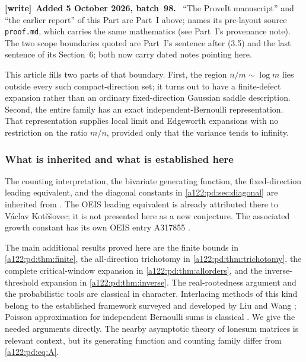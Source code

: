 \documentclass[11pt,letterpaper]{article}
\newenvironment{writenote}[1][]{\par\smallskip\begingroup\small
 \noindent\textbf{[write]}\if\relax\detokenize{#1}\relax\else~\textbf{#1.}\fi\ }%
 {\par\endgroup\smallskip}
\numberwithin{equation}{subsection}
\theoremstyle{definition}
\theoremstyle{remark}
\theoremstyle{plain}
\begin{document}
\begin{writenote}[Added 5 October 2026, batch~98]
``The ProveIt manuscript'' and ``the earlier report'' of this Part are
Part~I above; \cite{a122:pd:repo} names its pre-layout source
\nolinkurl{proof.md}, which carries the same mathematics (see Part~I's
provenance note). The two scope boundaries quoted are Part~I's sentence
after (3.5) and the last sentence of its Section~6; both now carry dated
notes pointing here.
\end{writenote}

This article fills two parts of that boundary. First, the region
$n/m\sim\log m$ lies outside every such compact-direction set; it turns
out to have a finite-defect expansion rather than an ordinary
fixed-direction Gaussian saddle description. Second, the entire family
has an exact independent-Bernoulli representation. That representation
supplies local limit and Edgeworth expansions with no restriction on the
ratio $m/n$, provided only that the variance tends to infinity.

\subsubsection{What is inherited and what is established here}
The counting interpretation, the bivariate generating function, the
fixed-direction leading equivalent, and the diagonal constants in
\cref{a122:pd:sec:diagonal} are inherited from \cite{a122:pd:repo}. The OEIS leading
equivalent is already attributed there to V\'aclav Kot\v{e}\v{s}ovec;
it is not presented here as a new conjecture. The associated growth
constant has its own OEIS entry A317855 \cite{a122:pd:oeis317855}.

The main additional results proved here are the finite bounds in
\cref{a122:pd:thm:finite}, the all-direction trichotomy in \cref{a122:pd:thm:trichotomy},
the complete critical-window expansion in \cref{a122:pd:thm:allorders}, and the
inverse-threshold expansion in \cref{a122:pd:thm:inverse}. The real-rootedness
argument and the probabilistic tools are classical in character.
Interlacing methods of this kind belong to the established framework
surveyed and developed by Liu and Wang \cite{a122:pd:liuwang}; Poisson
approximation for independent Bernoulli sums is classical
\cite{a122:pd:lecam}. We give the needed arguments directly.
The nearby asymptotic theory of lonesum matrices \cite{a122:pd:klm} is relevant
context, but its generating function and counting family differ from
\eqref{a122:pd:eq:A}.
\end{document}
